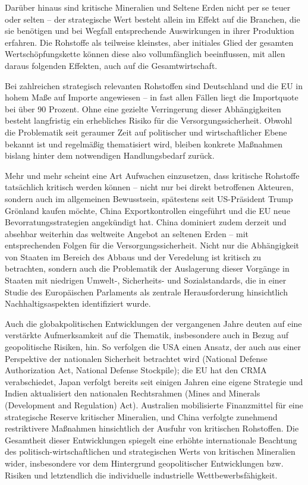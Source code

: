 \documentclass[12pt,a4paper,oneside]{book} %
\begin{document}
	Darüber hinaus sind kritische Mineralien und Seltene Erden nicht per se teuer oder selten -- der strategische Wert besteht allein im Effekt auf die Branchen, die sie benötigen und bei Wegfall entsprechende Auswirkungen in ihrer Produktion erfahren. Die Rohstoffe als teilweise kleinstes, aber initiales Glied der gesamten Wertschöpfungskette können diese also vollumfänglich beeinflussen, mit allen daraus folgenden Effekten, auch auf die Gesamtwirtschaft.
	
	Bei zahlreichen strategisch relevanten Rohstoffen sind Deutschland und die EU in hohem Maße auf Importe angewiesen -- in fast allen Fällen liegt die Importquote bei über 90 Prozent. Ohne eine gezielte Verringerung dieser Abhängigkeiten besteht langfristig ein erhebliches Risiko für die Versorgungssicherheit. Obwohl die Problematik seit geraumer Zeit auf politischer und wirtschaftlicher Ebene bekannt ist und regelmäßig thematisiert wird, bleiben konkrete Maßnahmen bislang hinter dem notwendigen Handlungsbedarf zurück.
	
	Mehr und mehr scheint eine Art Aufwachen einzusetzen, dass kritische Rohstoffe tatsächlich kritisch werden können -- nicht nur bei direkt betroffenen Akteuren, sondern auch im allgemeinen Bewusstsein, spätestens seit US-Präsident Trump Grönland kaufen möchte, China Exportkontrollen eingeführt und die EU neue Bevorratungsstrategien angekündigt hat. China dominiert zudem derzeit und absehbar weiterhin das weltweite Angebot an seltenen Erden -- mit entsprechenden Folgen für die Versorgungssicherheit. Nicht nur die Abhängigkeit von Staaten im Bereich des Abbaus und der Veredelung ist kritisch zu betrachten, sondern auch die Problematik der Auslagerung dieser Vorgänge in Staaten mit niedrigen Umwelt-, Sicherheits- und Sozialstandards,\autocite[siehe hierzu]{ÖAW Artikel} die in einer Studie des Europäischen Parlaments als zentrale Herausforderung hinsichtlich Nachhaltigsaspekten identifiziert wurde.\autocite[16]{The role of research and innovation in ensuring a safe and sustainable supply of critical raw materials in the EU}
	
	Auch die globakpolitischen Entwicklungen der vergangenen Jahre deuten auf eine verstärkte Aufmerksamkeit auf die Thematik, insbesondere auch in Bezug auf geopolitische Risiken, hin. So verfolgen die USA einen Ansatz, der auch aus einer Perspektive der nationalen Sicherheit betrachtet wird (National Defense Authorization Act, National Defense Stockpile); die EU hat den CRMA verabschiedet, Japan verfolgt bereits seit einigen Jahren eine eigene Strategie und Indien aktualisiert den nationalen Rechtsrahmen (Mines and Minerals (Development and Regulation) Act). Australien mobilisierte Finanzmittel für eine strategische Reserve kritischer Mineralien, und China verfolgte zunehmend restriktivere Maßnahmen hinsichtlich der Ausfuhr von kritischen Rohstoffen.
	Die Gesamtheit dieser Entwicklungen spiegelt eine erhöhte internationale Beachtung des politisch-wirtschaftlichen und strategischen Werts von kritischen Mineralien wider, insbesondere vor dem Hintergrund geopolitischer Entwicklungen bzw. Risiken und letztendlich die individuelle industrielle Wettbewerbsfähigkeit.
	
\end{document}
